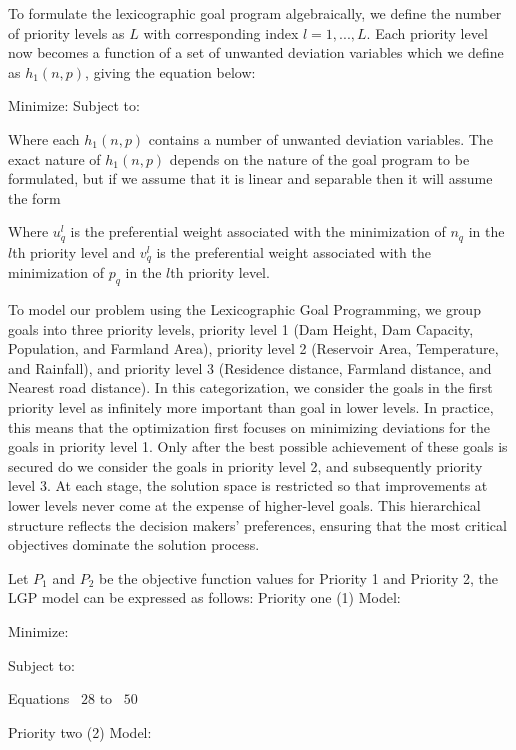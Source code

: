 To formulate the lexicographic goal program algebraically, we define the number of priority levels as $L$ with corresponding index $l = 1, ..., L.$ Each priority level now becomes a function of a set of unwanted deviation variables which we define as $h_1(n, p)$, giving the equation below:

Minimize:
            \EqLObjectiveThirtyThree
Subject to:
            \EqGGPMinFunctionSubTwo
            \EqCGPConstraintEight
            \EqGGPMinFunctionSubFour   

Where each $h_1(n,p)$ contains a number of unwanted deviation variables. The exact nature of $h_1(n,p)$ depends on the nature of the goal program to be formulated, but if we assume that it is linear and separable then it will assume the form 

            \EqLObjectiveThirtyFour

Where $u_q^l$ is the preferential weight associated with the minimization of $n_q$ in the $l$th priority level and $v_q^l$ is the preferential weight associated with the minimization of $p_q$ in the $l$th priority level. 

To model our problem using the Lexicographic Goal Programming, we group goals into three priority levels, priority level 1 (Dam Height, Dam Capacity, Population, and Farmland Area), priority level 2 (Reservoir Area, Temperature, and Rainfall), and priority level 3 (Residence distance, Farmland distance, and Nearest road distance). In this categorization, we consider the goals in the first priority level as infinitely more important than goal in lower levels.
In practice, this means that the optimization first focuses on minimizing deviations for the goals in priority level 1. Only after the best possible achievement of these goals is secured do we consider the goals in priority level 2, and subsequently priority level 3. At each stage, the solution space is restricted so that improvements at lower levels never come at the expense of higher-level goals. This hierarchical structure reflects the decision makers' preferences, ensuring that the most critical objectives dominate the solution process.

Let $P_1$ and $P_2$ be the objective function values for Priority 1 and Priority 2, the LGP model can be expressed as follows:
Priority one (1) Model:

Minimize:
        \EqLGPObjectivePriorityOneThirtyFive

Subject to:

       \begin{center}
        Equations ~$28$ to ~$50$
        \end{center}  
Priority two (2) Model:


